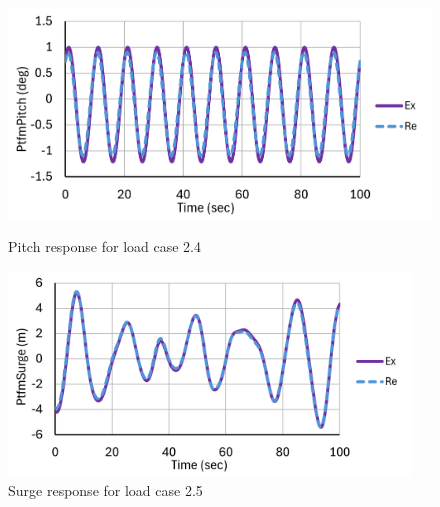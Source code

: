 \documentclass[a4paper, 11pt]{article}
\begin{document}
\begin{figure}[H]
    \begin{minipage}{0.48\textwidth}
        \centering
        \includegraphics[width=1\textwidth]{2.4_pitch_mine.png}
        \caption{\small Pitch response for load case 2.4}
        \label{fig:2.4_pitch_mine_recreated}
    \end{minipage}
    \hfill
    \begin{minipage}{0.5\textwidth}
        \centering
        \includegraphics[width=0.95\textwidth]{2.5_surge_mine.png}
        \caption{\small Surge response for load case 2.5}
        \label{fig:2.5_surge_mine_recreated}
    \end{minipage}
\end{figure}
\end{document}
